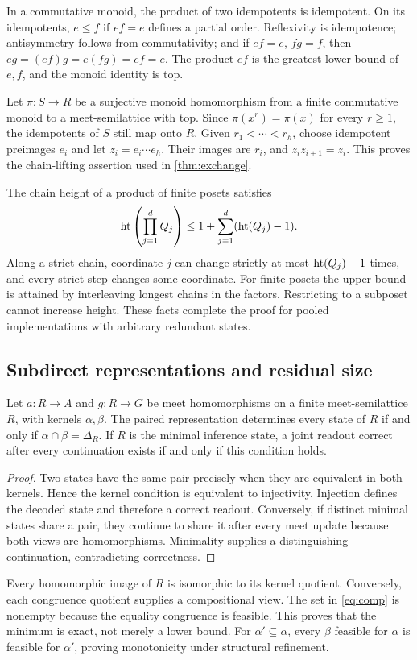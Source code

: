 In a commutative monoid, the product of two idempotents is idempotent. On its idempotents, $e\le f$ if $ef=e$ defines a partial order. Reflexivity is idempotence; antisymmetry follows from commutativity; and if $ef=e$, $fg=f$, then $eg=(ef)g=e(fg)=ef=e$. The product $ef$ is the greatest lower bound of $e,f$, and the monoid identity is top.

Let $\pi:S\to R$ be a surjective monoid homomorphism from a finite commutative monoid to a meet-semilattice with top. Since $\pi(x^r)=\pi(x)$ for every $r\ge1$, the idempotents of $S$ still map onto $R$. Given $r_1<\cdots<r_h$, choose idempotent preimages $e_i$ and let $z_i=e_i\cdots e_h$. Their images are $r_i$, and $z_iz_{i+1}=z_i$. This proves the chain-lifting assertion used in \cref{thm:exchange}.

The chain height of a product of finite posets satisfies
\[
 \operatorname{ht}\left(\prod_{j=1}^dQ_j\right)
 \le 1+\sum_{j=1}^d(\operatorname{ht}(Q_j)-1).
\]
Along a strict chain, coordinate $j$ can change strictly at most $\operatorname{ht}(Q_j)-1$ times, and every strict step changes some coordinate. For finite posets the upper bound is attained by interleaving longest chains in the factors. Restricting to a subposet cannot increase height. These facts complete the proof for pooled implementations with arbitrary redundant states.

\subsection{Subdirect representations and residual size}\label{app:congruence}
\begin{proposition}\label{prop:congruence}
Let $a:R\to A$ and $g:R\to G$ be meet homomorphisms on a finite meet-semilattice $R$, with kernels $\alpha,\beta$. The paired representation determines every state of $R$ if and only if $\alpha\cap\beta=\Delta_R$. If $R$ is the minimal inference state, a joint readout correct after every continuation exists if and only if this condition holds.
\end{proposition}
\begin{proof}
Two states have the same pair precisely when they are equivalent in both kernels. Hence the kernel condition is equivalent to injectivity. Injection defines the decoded state and therefore a correct readout. Conversely, if distinct minimal states share a pair, they continue to share it after every meet update because both views are homomorphisms. Minimality supplies a distinguishing continuation, contradicting correctness.
\end{proof}
Every homomorphic image of $R$ is isomorphic to its kernel quotient. Conversely, each congruence quotient supplies a compositional view. The set in \eqref{eq:comp} is nonempty because the equality congruence is feasible. This proves that the minimum is exact, not merely a lower bound. For $\alpha'\subseteq\alpha$, every $\beta$ feasible for $\alpha$ is feasible for $\alpha'$, proving monotonicity under structural refinement.

